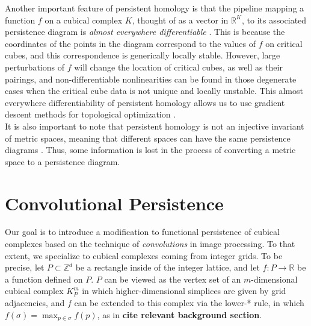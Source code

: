\documentclass[conference]{IEEEtran}
\theoremstyle{definition}
\numberwithin{figure}{section}
\begin{document}
Another important feature of persistent homology is that the pipeline mapping a function $f$ on a cubical complex $K$, thought of as a vector in $\mathbb{R}^K$, to its associated persistence diagram is  \emph{almost everywhere differentiable}  \cite{gameiro2016continuation,poulenard2018topological}. This is because the coordinates of the points in the diagram correspond to the values of $f$ on critical cubes, and this correspondence is generically locally stable. However, large perturbations of $f$ will change the location of critical cubes, as well as their pairings, and non-differentiable nonlinearities can be found in those degenerate cases when the critical cube data is not unique and locally unstable. This almost everywhere differentiability of persistent homology allows us to use gradient descent methods for topological optimization  \cite{carriere2021optimizing}.\\ 


It is also important to note that persistent homology is not an injective invariant of metric spaces, meaning that different spaces can have the same persistence diagrams \cite{curry2018fiber,leygonie2021fiber,leygonie2021algorithmic}. Thus, some information is lost in the process of converting a metric space to a persistence diagram.

\section{Convolutional Persistence}

Our goal is to introduce a modification to functional persistence of cubical complexes based on the technique of \emph{convolutions} in image processing. To that extent, we specialize to cubical complexes coming from integer grids. To be precise, let $P \subset \mathbb{Z}^d$ be a rectangle inside of the integer lattice, and let $f: P \to \mathbb{R}$ be a function defined on $P$. $P$ can be viewed as the vertex set of an $m$-dimensional cubical complex $K^{m}_{P}$ in which higher-dimensional simplices are given by grid adjacencies, and $f$ can be extended to this complex via the lower-* rule, in which $f(\sigma) = \max_{p \in \sigma}f(p)$, as in {\bf cite relevant background section}.\\
\end{document}
